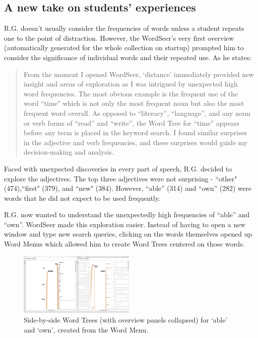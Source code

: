 \documentclass{sig-alternate}
\begin{document}
 \subsection{A new take on students' experiences}

R.G. doesn't usually consider the frequencies of words unless a student repeats one to the point of distraction. However, the WordSeer's very first overview (automatically generated for the whole collection on startup) prompted him to consider the significance of individual words and their repeated use.  As he states:
\begin{quote}
From the moment I opened WordSeer, `distance' immediately provided new insight and areas of exploration as I was intrigued by unexpected high word frequencies.  The most obvious example is the frequent use of the word ``time" which is not only the most frequent noun but also the most frequent word overall.  As opposed to ``literacy'', ``language'', and any noun or verb forms of ``read'' and ``write'', the Word Tree for ``time'' appears before any term is placed in the keyword search.   I found similar surprises in the adjective and verb frequencies, and these surprises would guide my decision-making and analysis.
\end{quote}
Faced with unexpected discoveries in every part of speech, R.G. decided to explore the adjectives. The top three adjectives were not surprising - ``other" (474),``first" (379), and ``new" (384).  However,  ``able'' (314) and ``own'' (282) were words that he did not expect to be used frequently.

R.G. now wanted to understand the unexpectedly high frequencies of ``able'' and ``own''. WordSeer made this exploration easier. Instead of having to open a new window and type new search queries, clicking on the words themselves opened up Word Menus which allowed him to create Word Trees centered on those words.

\begin{figure}[h!]
\includegraphics[width=0.5\textwidth]{fig/rex/04.png}
\caption{ Side-by-side Word Trees (with overview panels collapsed) for `able' and `own', created from the Word Menu. \label{fig:rex04}}
\end{figure}
\end{document}

